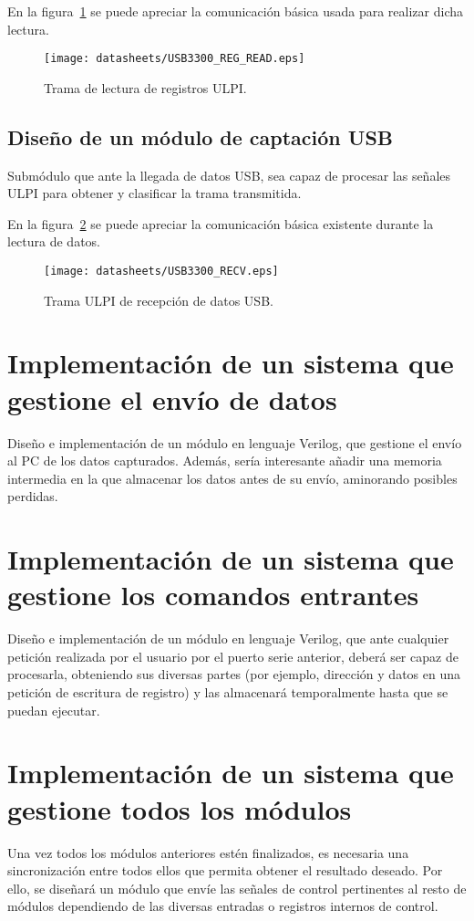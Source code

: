 En la figura~\ref{fig:ULPI_REG_READ} se puede apreciar la comunicación básica usada para realizar dicha lectura.
\begin{figure}[hbt]
    \centering
    \texttt{[image: datasheets/USB3300\_REG\_READ.eps]}
    \caption{Trama de lectura de registros ULPI.}
    \label{fig:ULPI_REG_READ}
\end{figure}

\subsection{Diseño de un módulo de captación USB}
Submódulo que ante la llegada de datos USB, sea capaz de procesar las señales ULPI para obtener y clasificar la trama transmitida.

En la figura~\ref{fig:ULPI_RECV} se puede apreciar la comunicación básica existente durante la lectura de datos.
\begin{figure}[hbt]
    \centering
    \texttt{[image: datasheets/USB3300\_RECV.eps]}
    \caption{Trama ULPI de recepción de datos USB.}
    \label{fig:ULPI_RECV}
\end{figure}



\section{Implementación de un sistema que gestione el envío de datos}
Diseño e implementación de un módulo en lenguaje Verilog, que gestione el envío al PC de los datos capturados. Además, sería interesante añadir una memoria intermedia en la que almacenar los datos antes de su envío, aminorando posibles perdidas.



\section{Implementación de un sistema que gestione los comandos entrantes}
Diseño e implementación de un módulo en lenguaje Verilog, que ante cualquier petición realizada por el usuario por el puerto serie anterior, deberá ser capaz de procesarla, obteniendo sus diversas partes (por ejemplo, dirección y datos en una petición de escritura de registro) y las almacenará temporalmente hasta que se puedan ejecutar.



\section{Implementación de un sistema que gestione todos los módulos}
Una vez todos los módulos anteriores estén finalizados, es necesaria una sincronización entre todos ellos que permita obtener el resultado deseado. Por ello, se diseñará un módulo que envíe las señales de control pertinentes al resto de módulos dependiendo de las diversas entradas o registros internos de control.



